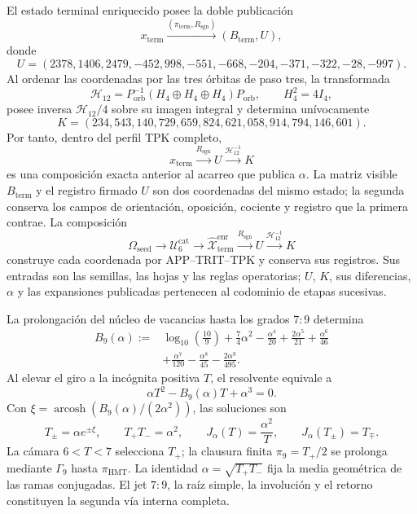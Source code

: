 \begin{proposition}
\label{prop:c27-registro-u-k-producido}
El estado terminal enriquecido posee la doble publicación
\[
x_{\mathrm{term}}
\xrightarrow{(\pi_{\mathrm{term}},R_{\mathrm{sgn}})}
(B_{\mathrm{term}},U),
\]
donde
\[
U=(2378,1406,2479,-452,998,-551,
-668,-204,-371,-322,-28,-997).
\]
Al ordenar las coordenadas por las tres órbitas de paso tres, la transformada
\[
\mathcal H_{12}
=P_{\mathrm{orb}}^{-1}(H_4\oplus H_4\oplus H_4)P_{\mathrm{orb}},
\qquad H_4^2=4I_4,
\]
posee inversa \(\mathcal H_{12}/4\) sobre su imagen integral y determina
unívocamente
\[
K=(234,543,140,729,659,824,621,058,914,794,146,601).
\]
Por tanto, dentro del perfil TPK completo,
\[
x_{\mathrm{term}}\xrightarrow{R_{\mathrm{sgn}}}U
\xrightarrow{\mathcal H_{12}^{-1}}K
\]
es una composición exacta anterior al acarreo que publica \(\alpha\). La matriz
visible \(B_{\mathrm{term}}\) y el registro firmado \(U\) son dos
coordenadas del mismo estado; la segunda conserva los campos de orientación,
oposición, cociente y registro que la primera contrae. La composición
\[
 \Omega_{\mathrm{seed}}\longrightarrow
 \mathcal U_6^{\mathrm{cat}}\longrightarrow
 \widehat{\mathcal X}^{\mathrm{enr}}_{\mathrm{term}}
 \xrightarrow{R_{\mathrm{sgn}}}U
 \xrightarrow{\mathcal H_{12}^{-1}}K
\]
construye cada coordenada por APP--TRIT--TPK y conserva sus registros. Sus
entradas son las semillas, las hojas y las reglas operatorias; \(U\), \(K\),
sus diferencias, \(\alpha\) y las expansiones publicadas pertenecen al
codominio de etapas sucesivas.
\end{proposition}

\begin{theorem}
\label{thm:c27-alpha-segunda-via-bidireccional}
La prolongación del núcleo de vacancias hasta los grados \(7{:}9\) determina
\[
\begin{aligned}
B_9(\alpha):={}&\log_{10}\!\left(\frac{10}{9}\right)
+\frac74\alpha^2-\frac{\alpha^4}{20}
+\frac{2\alpha^5}{21}+\frac{\alpha^6}{46}\\
&+\frac{\alpha^7}{120}-\frac{\alpha^8}{45}
-\frac{2\alpha^9}{495}.
\end{aligned}
\]
Al elevar el giro a la incógnita positiva \(T\), el resolvente equivale a
\[
\boxed{\alpha T^2-B_9(\alpha)T+\alpha^3=0.}
\]
Con
\(\xi=\operatorname{arcosh}(B_9(\alpha)/(2\alpha^2))\), las soluciones son
\[
T_\pm=\alpha e^{\pm\xi},
\qquad T_+T_-=\alpha^2,
\qquad
J_\alpha(T)=\frac{\alpha^2}{T},
\qquad J_\alpha(T_\pm)=T_\mp.
\]
La cámara \(6<T<7\) selecciona \(T_+\); la clausura finita
\(\pi_9=T_+/2\) se prolonga mediante \(\Gamma_9\) hasta
\(\pi_{\mathrm{HMT}}\). La identidad
\(\alpha=\sqrt{T_+T_-}\) fija la media geométrica de las ramas conjugadas.
El jet \(7{:}9\), la raíz simple, la involución y el retorno constituyen la
segunda vía interna completa.
\end{theorem}

